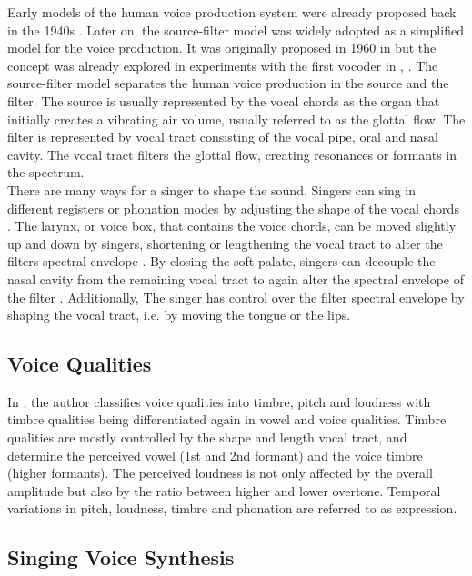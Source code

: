 \documentclass{article}
\begin{document}
Early models of the human voice production system were already proposed back in the 1940s \cite{chiba_vowel_1942}. Later on, the source-filter model was widely adopted as a simplified model for the voice production. It was originally proposed in 1960 in \cite{fant_acoustic_1960} but the concept was already explored in experiments with the first vocoder in \cite{dudley_vocoder_1939}, \cite{dudley_remaking_1939}. The source-filter model separates the human voice production in the source and the filter. The source is usually represented by the vocal chords as the organ that initially creates a vibrating air volume, usually referred to as the glottal flow. The filter is represented by vocal tract consisting of the vocal pipe, oral and nasal cavity. The vocal tract filters the glottal flow, creating resonances or formants in the spectrum. \\
There are many ways for a singer to shape the sound. Singers can sing in different registers or phonation modes\cite{sundberg_science_1987} by adjusting the shape of the vocal chords \cite{salomao_what_2009}. The larynx, or voice box, that contains the voice chords, can be moved slightly up and down by singers, shortening or lengthening the vocal tract to alter the filters spectral envelope \cite{sundberg_raised_1976}. By closing the soft palate, singers can decouple the nasal cavity from the remaining vocal tract to again alter the spectral envelope of the filter \cite{elie_characterisation_2009}. Additionally, The singer has control over the filter spectral envelope by shaping the vocal tract, i.e. by moving the tongue or the lips.

\subsection{Voice Qualities}

In \cite{sundberg_perceptual_1994}, the author classifies voice qualities into timbre, pitch and loudness with timbre qualities being differentiated again in vowel and voice qualities. 
Timbre qualities are mostly controlled by the shape and length vocal tract, and determine the perceived vowel (1st and 2nd formant) and the voice timbre (higher formants). The perceived loudness is not only affected by the overall amplitude but also by the ratio between higher and lower overtone. Temporal variations in pitch, loudness, timbre and phonation are referred to as expression. 

\subsection{Singing Voice Synthesis}
\end{document}
